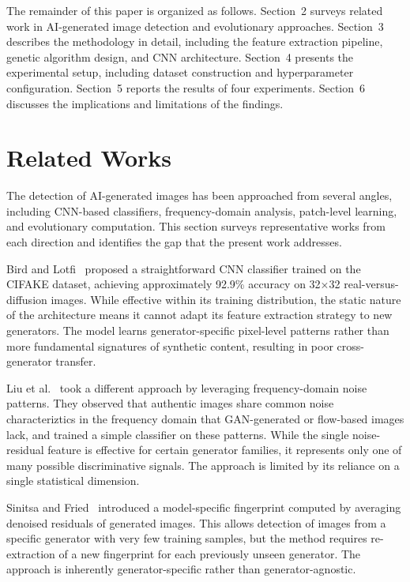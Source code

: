 \documentclass[runningheads]{llncs}
\begin{document}
The remainder of this paper is organized as follows. Section~2 surveys related work in AI-generated image detection and evolutionary approaches. Section~3 describes the methodology in detail, including the feature extraction pipeline, genetic algorithm design, and CNN architecture. Section~4 presents the experimental setup, including dataset construction and hyperparameter configuration. Section~5 reports the results of four experiments. Section~6 discusses the implications and limitations of the findings.

\section{Related Works}

The detection of AI-generated images has been approached from several angles, including CNN-based classifiers, frequency-domain analysis, patch-level learning, and evolutionary computation. This section surveys representative works from each direction and identifies the gap that the present work addresses.

Bird and Lotfi~\cite{bird2023cifake} proposed a straightforward CNN classifier trained on the CIFAKE dataset, achieving approximately 92.9\% accuracy on 32$\times$32 real-versus-diffusion images. While effective within its training distribution, the static nature of the architecture means it cannot adapt its feature extraction strategy to new generators. The model learns generator-specific pixel-level patterns rather than more fundamental signatures of synthetic content, resulting in poor cross-generator transfer.

Liu et al.~\cite{liu2022detecting} took a different approach by leveraging frequency-domain noise patterns. They observed that authentic images share common noise characteriztics in the frequency domain that GAN-generated or flow-based images lack, and trained a simple classifier on these patterns. While the single noise-residual feature is effective for certain generator families, it represents only one of many possible discriminative signals. The approach is limited by its reliance on a single statistical dimension.

Sinitsa and Fried~\cite{sinitsa2024fingerprint} introduced a model-specific fingerprint computed by averaging denoised residuals of generated images. This allows detection of images from a specific generator with very few training samples, but the method requires re-extraction of a new fingerprint for each previously unseen generator. The approach is inherently generator-specific rather than generator-agnostic.
\end{document}
